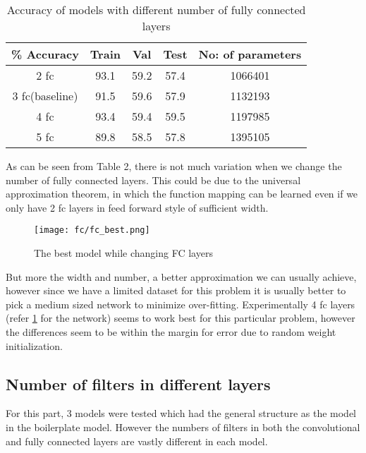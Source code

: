 \documentclass{article}
\begin{document}
\begin{table}[h!]
\begin{center}
 \begin{tabular}{||c | c c c| c||} 
 
 \hline
\% Accuracy  &  Train &  Val & Test & No: of parameters\\ [0.5ex] 
 \hline\hline
 2 fc & 93.1 & 59.2 & 57.4 & 1066401\\
 \hline
 3 fc(baseline) & 91.5 & 59.6 & 57.9 & 1132193\\
 \hline
 4 fc & 93.4 & 59.4 & 59.5 & 1197985\\
 \hline
 5 fc & 89.8 & 58.5 & 57.8 & 1395105\\
 \hline
 
\end{tabular}
\end{center}
\label{table:fc_table}
\vspace{-1.0em}
\caption{Accuracy of models with different number of fully connected layers} 
\end{table}

\noindent
As can be seen from Table 2, there is not much variation when we change the number of fully connected layers. This could be due to the universal approximation theorem, in which the function mapping can be learned even if we only have 2 fc layers in feed forward style of sufficient width. 
\\

\begin{figure}[H]
    \centering
    \texttt{[image: fc/fc\_best.png]}
    \caption{The best model while changing FC layers}
    \label{fig:fc_best}
\end{figure}

\noindent
But more the width and number, a better approximation we can usually achieve, however since we have a limited dataset for this problem it is usually better to pick a medium sized network to minimize over-fitting.
Experimentally 4 fc layers (refer \ref{fig:fc_best} for the network) seems to work best for this particular problem, however the differences seem to be within the margin for error due to random weight initialization. 

\subsection{Number of filters in different layers}
For this part, 3 models were tested which had the general structure as the model in the boilerplate model. However the numbers of filters in both the convolutional and fully connected layers are vastly different in each model. \\
\end{document}
